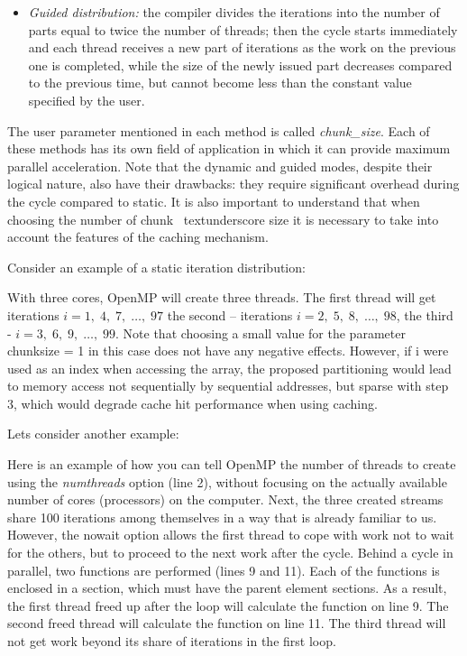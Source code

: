 {\begin{itemize}
		\item\textit{Guided distribution:} the compiler divides the iterations into the number of parts equal to twice the number of threads; then the cycle starts immediately and each thread receives a new part of iterations as the work on the previous one is completed, while the size of the newly issued part decreases compared to the previous time, but cannot become less than the constant value specified by the user.
	\end{itemize}
	\par The user parameter mentioned in each method is called  \textit{chunk\_size}. Each of these methods has its own field of application in which it can provide maximum parallel acceleration. Note that the dynamic and guided modes, despite their logical nature, also have their drawbacks: they require significant overhead during the cycle compared to static. It is also important to understand that when choosing the number of chunk \ textunderscore size it is necessary to take into account the features of the caching mechanism.
	\par Consider an example of a static iteration distribution:
	\begin{figure}[H]
		
	\end{figure}
	\par With three cores, OpenMP will create three threads. The first thread will get iterations $i=1,\;4,\;7,\;…,\;97$ the second – iterations $i=2,\;5,\;8,\;…,\;98$, the third -  $i=3,\;6,\;9,\;…,\;99$. Note that choosing a small value for the parameter chunk\textunderscore size = 1 in this case does not have any negative effects. However, if i were used as an index when accessing the array, the proposed partitioning would lead to memory access not sequentially by sequential addresses, but sparse with step 3, which would degrade cache hit performance when using caching.
	\par Lets consider another example: 
	\begin{figure}[H]
		
	\end{figure}
	\par Here is an example of how you can tell OpenMP the number of threads to create using the \textit{num\textunderscore threads} option (line 2), without focusing on the actually available number of cores (processors) on the computer. Next, the three created streams share 100 iterations among themselves in a way that is already familiar to us. However, the nowait option allows the first thread to cope with work not to wait for the others, but to proceed to the next work after the cycle. Behind a cycle in parallel, two functions are performed (lines 9 and 11). Each of the functions is enclosed in a section, which must have the parent element sections. As a result, the first thread freed up after the loop will calculate the function on line 9. The second freed thread will calculate the function on line 11. The third thread will not get work beyond its share of iterations in the first loop.
}

